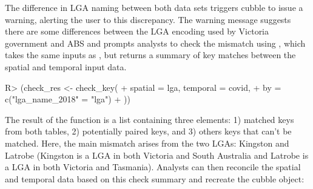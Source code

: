 \documentclass[
  shortnames]{jss}
\begin{document}
The difference in LGA naming between both data sets triggers cubble to issue a warning, alerting the user to this discrepancy. The warning message suggests there are some differences between the LGA encoding used by Victoria government and ABS and prompts analysts to check the mismatch using , which takes the same inputs as , but returns a summary of key matches between the spatial and temporal input data.

\begin{CodeChunk}
\begin{CodeInput}
R> (check_res <- check_key(
+   spatial = lga, temporal = covid, 
+   by = c("lga_name_2018" = "lga")
+ ))
\end{CodeInput}
\end{CodeChunk}

The result of the  function is a list containing three elements: 1) matched keys from both tables, 2) potentially paired keys, and 3) others keys that can't be matched. Here, the main mismatch arises from the two LGAs: Kingston and Latrobe (Kingston is a LGA in both Victoria and South Australia and Latrobe is a LGA in both Victoria and Tasmania). Analysts can then reconcile the spatial and temporal data based on this check summary and recreate the cubble object:
\end{document}
